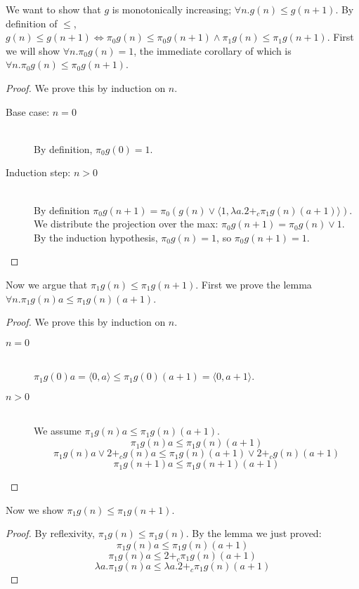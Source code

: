 We want to show that $g$ is monotonically increasing; $\forall n.g(n) \leq g(n+1)$.
By definition of $\leq$, $g(n) \leq g(n+1) \Leftrightarrow \pi_0 g(n) \leq \pi_0 g(n+1) \land \pi_1 g(n) \leq \pi_1 g(n+1)$.
First we will show $\forall n. \pi_0 g(n) = 1$, the immediate corollary of which is $\forall n. \pi_0 g(n) \leq \pi_0 g(n+1)$.
\begin{proof}
We prove this by induction on $n$.
  \begin{description}
    \item[Base case: $n=0$]\hfill \\
      By definition, $\pi_0 g(0) = 1$.
    \item[Induction step: $n>0$]\hfill \\
      By definition $\pi_0 g(n+1) = \pi_0 (g(n) \vee \langle 1, \lambda a. 2 +_c \pi_1g(n) (a+1)\rangle)$.
      We distribute the projection over the max: $\pi_0 g(n+1) = \pi_0 g(n) \vee 1$.
      By the induction hypothesis, $\pi_0 g(n) = 1$, so $\pi_0 g(n+1) = 1$.
  \end{description}
\end{proof}
Now we argue that $\pi_1g(n) \leq \pi_1 g(n+1)$.
First we prove the lemma $\forall n.\pi_1 g(n) a \leq \pi_1 g(n) (a+1)$.
\begin{proof}
  We prove this by induction on $n$.
  \begin{description}
    \item[$n=0$]\hfill \\
      $\pi_1 g(0) a = \langle 0,a\rangle \leq \pi_1 g(0) (a+1) = \langle 0,a+1 \rangle$.
    \item[$n>0$]\hfill \\
      We assume $\pi_1 g(n) a \leq \pi_1 g(n) (a+1)$.
      \[ \pi_1 g(n) a \leq \pi_1 g(n) (a+1) \]
      \[ \pi_1 g(n) a \vee 2 +_c g(n) a \leq \pi_1 g(n) (a+1) \vee 2 +_c g(n) (a+1) \]
      \[ \pi_1 g(n+1) a \leq \pi_1 g(n+1) (a+1) \]
  \end{description}
\end{proof}

Now we show $\pi_1 g(n) \leq \pi_1 g(n+1)$.
\begin{proof}
  By reflexivity, $\pi_1 g(n) \leq \pi_1 g(n)$.
  By the lemma we just proved:
  \[ \pi_1 g(n) a \leq \pi_1 g(n) (a+1) \]
  \[ \pi_1 g(n) a \leq 2 +_c \pi_1 g(n) (a+1) \]
  \[ \lambda a.\pi_1 g(n) a \leq \lambda a. 2 +_c \pi_1 g(n) (a+1) \]
\end{proof}

